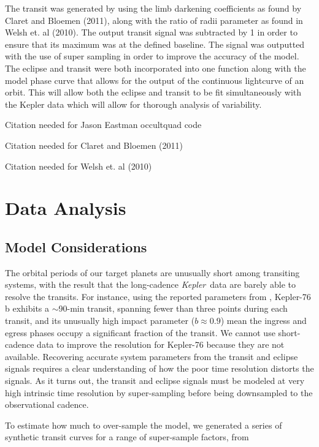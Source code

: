 \documentclass[manuscript]{aastex}
\newcommand{\kepler}{{\it Kepler}}
\begin{document}
    The transit was generated by using the limb darkening coefficients as found by Claret and Bloemen (2011), along with the ratio of radii parameter as found in Welsh et. al (2010). The output transit signal was subtracted by 1 in order to ensure that its maximum was at the defined baseline. The signal was outputted with the use of super sampling in order to improve the accuracy of the model. 
    The eclipse and transit were both incorporated into one function along with the model phase curve that allows for the output of the continuous lightcurve of an orbit. This will allow both the eclipse and transit to be fit simultaneously with the Kepler data which will allow for thorough analysis of variability. 


Citation needed for Jason Eastman occultquad code

Citation needed for Claret and Bloemen (2011)

Citation needed for  Welsh et. al (2010)

\section{Data Analysis}

\subsection{Model Considerations}
The orbital periods of our target planets are unusually short among transiting systems, with the result that the long-cadence \kepler\ data are barely able to resolve the transits. For instance, using the reported parameters from \citep{2013ApJ...771...26F}, Kepler-76 b exhibits a $\sim$90-min transit, spanning fewer than three points during each transit, and its unusually high impact parameter ($b \approx 0.9$) mean the ingress and egress phases occupy a significant fraction of the transit. We cannot use short-cadence data to improve the resolution for Kepler-76 because they are not available. Recovering accurate system parameters from the transit and eclipse signals requires a clear understanding of how the poor time resolution distorts the signals. As it turns out, the transit and eclipse signals must be modeled at very high intrinsic time resolution by super-sampling before being downsampled to the observational cadence.

To estimate how much to over-sample the model, we generated a series of synthetic transit curves for a range of super-sample factors, from 
\end{document}
